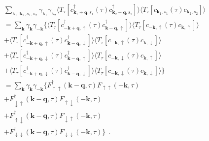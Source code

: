 \documentclass[a4j]{jsarticle}
\begin{document}
\begin{align}
	 &
	\sum_{\bm{k}_{1} , \bm{k}_{2} , s_{1} ,s_{2} }
	\gamma_{\bm{k}_{1}}
	\gamma_{\bm{k}_{2}}
	\langle T_{\tau} [
			c_{ \bm{k}_{1}+\bm{q} , s_{1} }^{\dagger} (\tau)
			c_{ \bm{k}_{2}-\bm{q} , s_{2} }^{\dagger}
		] \rangle
	\langle T_{\tau} [
			c_{ \bm{k}_{1} , s_{1} } (\tau)
			c_{ \bm{k}_{2} , s_{2} }
		] \rangle
	\\ &=
	\sum_{ \bm{k} }
	\gamma_{\bm{k}}
	\gamma_{-\bm{k}}
	\Big\{
	\langle T_{\tau} [
			c_{ - \bm{k} + \bm{q} , \uparrow }^{\dagger} (\tau)
			c_{ \bm{k} - \bm{q} , \uparrow }^{\dagger}
		] \rangle
	\langle T_{\tau} [
			c_{ - \bm{k} , \uparrow } (\tau)
			c_{ \bm{k} , \uparrow }
		] \rangle
	\nonumber \\ &
	+
	\langle T_{\tau} [
			c_{ - \bm{k} + \bm{q} , \uparrow }^{\dagger} (\tau)
			c_{ \bm{k} - \bm{q} , \downarrow }^{\dagger}
		] \rangle
	\langle T_{\tau} [
			c_{ - \bm{k} , \uparrow } (\tau)
			c_{ \bm{k} , \downarrow }
		] \rangle
	\nonumber \\[2mm] &
	+
	\langle T_{\tau} [
			c_{ - \bm{k} + \bm{q} , \downarrow }^{\dagger} (\tau)
			c_{ \bm{k} - \bm{q} , \uparrow }^{\dagger}
		] \rangle
	\langle T_{\tau} [
			c_{ - \bm{k} , \downarrow } (\tau)
			c_{ \bm{k} , \uparrow }
		] \rangle
	\nonumber \\[2mm] &
	+
	\langle T_{\tau} [
			c_{ - \bm{k} + \bm{q} , \downarrow }^{\dagger} (\tau)
			c_{ \bm{k} - \bm{q} , \downarrow }^{\dagger}
		] \rangle
	\langle T_{\tau} [
			c_{ - \bm{k} , \downarrow } (\tau)
			c_{ \bm{k} , \downarrow }
		] \rangle
	\Big\}
	\nonumber \\[2mm]
	 & =
	\sum_{ \bm{k} }
	\gamma_{\bm{k}}
	\gamma_{-\bm{k}}
	\Big\{
	F_{ \uparrow \uparrow }^{\dagger}( \bm{k} - \bm{q} , \tau )
	F_{ \uparrow \uparrow } ( - \bm{k} , \tau )
	\nonumber \\ &
	+
	F_{ \downarrow \uparrow }^{\dagger}( \bm{k} - \bm{q} , \tau )
	F_{ \uparrow \downarrow } ( - \bm{k} , \tau )
	\nonumber \\[2mm] &
	+
	F_{ \uparrow \downarrow }^{\dagger}( \bm{k} - \bm{q} , \tau )
	F_{ \downarrow \uparrow } ( - \bm{k} , \tau )
	\nonumber \\[2mm] &
	+
	F_{ \downarrow \downarrow }^{\dagger}( \bm{k} - \bm{q} , \tau )
	F_{ \downarrow \downarrow } ( - \bm{k} , \tau )
	\Big\}
	\ \ .
\end{align}
\end{document}
